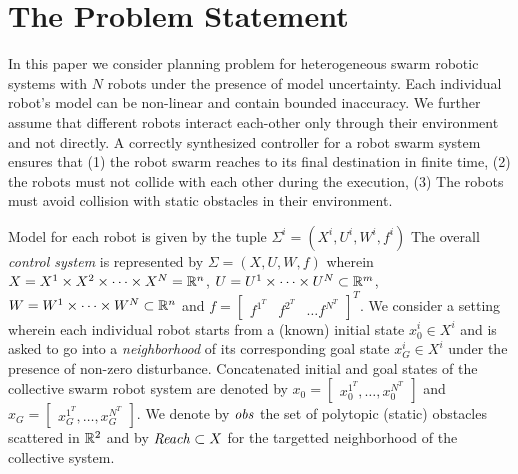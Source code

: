 
\section{The Problem Statement}
In this paper we consider planning problem for heterogeneous swarm robotic systems with $N$  robots under the presence of model uncertainty. Each individual robot's model can be non-linear and contain bounded inaccuracy. We further assume that different robots interact each-other only through their environment and not directly. A correctly synthesized controller for a robot swarm system ensures that (1) the robot swarm reaches to its final destination in finite time, (2) the robots must not collide with each other during the execution, (3) The robots must avoid collision with static obstacles in their environment.%

Model for each robot is given by the tuple $\Sigma^i = (X^i, U^i, W^i, f^i)$ %
The overall \emph{control system} is represented by $\Sigma = (X, U, W, f)$ wherein $X=X^1\times X^2\times\dots\times X^N=\mathbb{R}^n$, $U=U^1\times\dots\times U^N\subset \mathbb{R}^m$, $W=W^1\times\dots\times W^N\subset \mathbb{R}^n$ and $f=\begin{bmatrix}f^{1^T} & f^{2^T}& \dots f^{N^T}\end{bmatrix}^T$. We consider a setting wherein each individual robot starts from a (known) initial state $x_0^i\in X^i$ and is asked to go into a \emph{neighborhood} of its corresponding goal state $x_G^i\in X^i$ under the presence of non-zero disturbance. Concatenated initial and goal states of the collective swarm robot system are denoted by $x_0=\begin{bmatrix}{x_0^{1^T},\ldots,x_0^{N^T}}\end{bmatrix}$ and $x_G=\begin{bmatrix}{x_G^{1^T},\ldots,x_G^{N^T}}\end{bmatrix}$.
We denote by $\mathit{obs}$ the set of polytopic (static) obstacles scattered in $\mathbb{R}^2$ and by $\mathit{Reach}\subset X$ for the targetted neighborhood of the collective system.%


